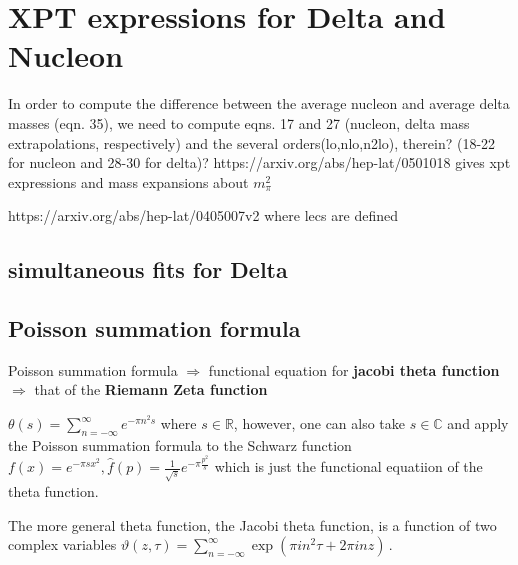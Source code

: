 \documentclass[12pt,tightenlines, raggedbottom, prd, notitlepage]{revtex4-1}
\begin{document}
\section*{XPT expressions for Delta and Nucleon}
In order to compute the difference between the average nucleon and average delta masses (eqn. 35), we need to compute eqns. 17 and 27
(nucleon, delta mass extrapolations, respectively) and the several orders(lo,nlo,n2lo), therein? (18-22 for nucleon and 28-30 for delta)?
https://arxiv.org/abs/hep-lat/0501018 gives xpt expressions and mass expansions about $m_\pi^2$

https://arxiv.org/abs/hep-lat/0405007v2 where lecs are defined






\subsection*{simultaneous fits for Delta}






\subsection*{Poisson summation formula}
Poisson summation formula $\Rightarrow $ functional equation for \textbf{jacobi theta function}
$\Rightarrow$ that of the \textbf{Riemann Zeta function}

$\theta(s) = \sum_{n=-\infty}^{\infty}e^{-\pi n^2s}$ where $s\in\mathbb{R}$, however, one can 
also take $s\in\mathbb{C}$ and apply the Poisson summation formula to the Schwarz function
$f(x) = e^{-\pi sx^2}, \hat{f}(p) = \frac{1}{\sqrt{s}}e^{-\pi \frac{p^2}{s}} $
which is just the functional equatiion of the theta function.

The more general theta function, the Jacobi theta function, is a function of two complex
variables $\vartheta(z,\tau) = \sum_{n = - \infty}^{\infty} \exp(\pi i n^2 \tau + 2\pi i n z) \,. $
\end{document}
